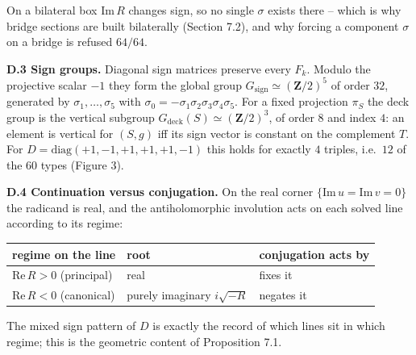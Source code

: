 On a bilateral box \(\mathrm{Im}\,R\) changes sign, so no single \(\sigma\) exists there -- which is why bridge sections are built bilaterally (Section 7.2), and why forcing a component \(\sigma\) on a bridge is refused \(64/64\).

\textbf{D.3 Sign groups.} Diagonal sign matrices preserve every \(F_k\). Modulo the projective scalar \(-1\) they form the global group \(G_{\mathrm{sign}} \simeq (\mathbf{Z}/2)^5\) of order \(32\), generated by \(\sigma_1, \dots, \sigma_5\) with \(\sigma_0 = -\sigma_1\sigma_2\sigma_3\sigma_4\sigma_5\). For a fixed projection \(\pi_S\) the deck group is the vertical subgroup \(G_{\mathrm{deck}}(S) \simeq (\mathbf{Z}/2)^3\), of order \(8\) and index \(4\): an element is vertical for \((S,g)\) iff its sign vector is constant on the complement \(T\). For \(D = \mathrm{diag}(+1,-1,+1,+1,+1,-1)\) this holds for exactly \(4\) triples, i.e.~\(12\) of the \(60\) types (Figure 3).

\textbf{D.4 Continuation versus conjugation.} On the real corner \(\{\mathrm{Im}\,u = \mathrm{Im}\,v = 0\}\) the radicand is real, and the antiholomorphic involution acts on each solved line according to its regime:

\begin{longtable}[]{@{}
  >{\raggedright\arraybackslash}p{}
  >{\raggedright\arraybackslash}p{}
  >{\raggedright\arraybackslash}p{}@{}}
\toprule\noalign{}
\begin{minipage}[b]{\linewidth}\raggedright
regime on the line
\end{minipage} & \begin{minipage}[b]{\linewidth}\raggedright
root
\end{minipage} & \begin{minipage}[b]{\linewidth}\raggedright
conjugation acts by
\end{minipage} \\
\midrule\noalign{}
\endhead
\bottomrule\noalign{}
\endlastfoot
\(\mathrm{Re}\,R > 0\) (principal) & real & fixes it \\
\(\mathrm{Re}\,R < 0\) (canonical) & purely imaginary \(i\sqrt{-R}\) & negates it \\
\end{longtable}

The mixed sign pattern of \(D\) is exactly the record of which lines sit in which regime; this is the geometric content of Proposition 7.1.

